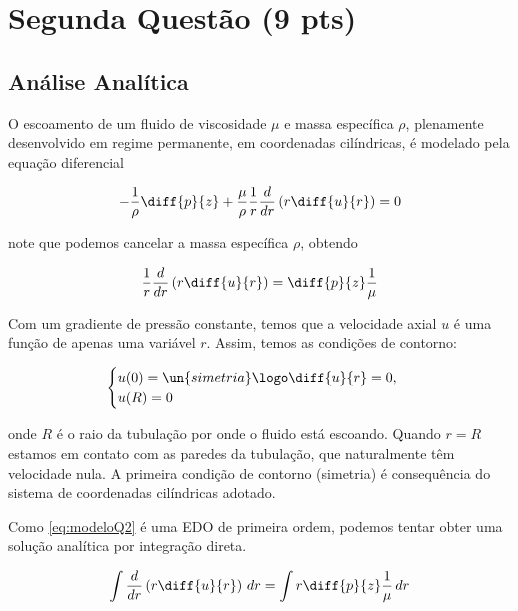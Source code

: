 
\section{Segunda Questão (9 pts)}

\subsection{Análise Analítica}


O escoamento de um fluido de viscosidade $\mu$ e massa específica $\rho$,
plenamente desenvolvido em regime permanente, em coordenadas cilíndricas,
é modelado pela equação diferencial

\[ -\frac{1}{\rho} \diff{p}{z} + \frac{\mu}{\rho} \frac{1}{r} \frac{d}{dr} \left(r\diff{u}{r}\right) = 0 \]

\noindent note que podemos cancelar a massa específica $\rho$, obtendo

\begin{equation}\label{eq:modeloQ2}
    \frac{1}{r} \frac{d}{dr} \left(r\diff{u}{r}\right) = \diff{p}{z} \frac{1}{\mu}
\end{equation}

Com um gradiente de pressão constante, temos que a velocidade axial $u$
é uma função de apenas uma variável $r$. Assim, temos as condições de contorno:

\begin{equation}\label{eq:modeloQ2Contorno}
    \begin{cases}
        u(0) = \un{simetria} \logo \diff{u}{r} = 0, \\
        u(R) = 0                                    \\
    \end{cases}
\end{equation}

\noindent onde $R$ é o raio da tubulação por onde o fluido está escoando. Quando
$r = R$ estamos em contato com as paredes da tubulação, que naturalmente têm
velocidade nula. A primeira condição de contorno (simetria) é consequência do sistema de coordenadas
cilíndricas adotado.

Como \eqref{eq:modeloQ2} é uma EDO de primeira ordem, podemos tentar obter uma solução
analítica por integração direta.

\[ \int \frac{d}{dr} \left(r\diff{u}{r}\right) \, dr = \int r \diff{p}{z} \frac{1}{\mu} \, dr \]

